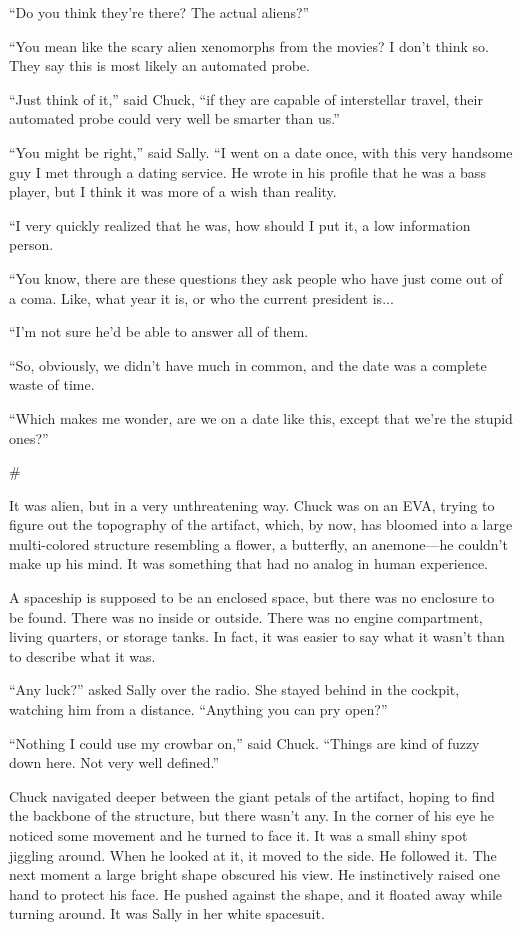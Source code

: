 \documentclass[12pt]{book}
\newcommand{\sbreak}{
\begin{center}
  \#
\end{center}
}
\begin{document}
``Do you think they're there? The actual aliens?''

``You mean like the scary alien xenomorphs from the movies? I don't think so. They say this is most likely an automated probe.

``Just think of it,'' said Chuck, ``if they are capable of interstellar travel, their automated probe could very well be smarter than us.''

``You might be right,'' said Sally. ``I went on a date once, with this very handsome guy I met through a dating service. He wrote in his profile that he was a bass player, but I think it was more of a wish than reality. 

``I very quickly realized that he was, how should I put it, a low information person. 

``You know, there are these questions they ask people who have just come out of a coma. Like, what year it is, or who the current president is...

``I'm not sure he'd be able to answer all of them.

``So, obviously, we didn't have much in common, and the date was a complete waste of time.

``Which makes me wonder, are we on a date like this, except that we're the stupid ones?''

\sbreak

It was alien, but in a very unthreatening way. Chuck was on an EVA, trying to figure out the topography of the artifact, which, by now, has bloomed into a large multi-colored structure resembling a flower, a butterfly, an anemone---he couldn't make up his mind. It was something that had no analog in human experience.

A spaceship is supposed to be an enclosed space, but there was no enclosure to be found. There was no inside or outside. There was no engine compartment, living quarters, or storage tanks. In fact, it was easier to say what it wasn't than to describe what it was.

``Any luck?'' asked Sally over the radio. She stayed behind in the cockpit, watching him from a distance. ``Anything you can pry open?''

``Nothing I could use my crowbar on,'' said Chuck. ``Things are kind of fuzzy down here. Not very well defined.''

Chuck navigated deeper between the giant petals of the artifact, hoping to find the backbone of the structure, but there wasn't any. In the corner of his eye he noticed some movement and he turned to face it. It was a small shiny spot jiggling around. When he looked at it, it moved to the side. He followed it. The next moment a large bright shape obscured his view. He instinctively raised one hand to protect his face. He pushed against the shape, and it floated away while turning around. It was Sally in her white spacesuit.
\end{document}
